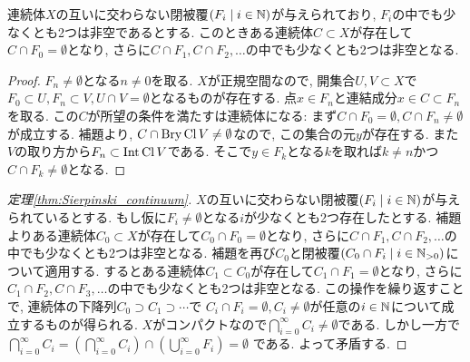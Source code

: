 \documentclass[uplatex, dvipdfmx, a4paper, 12pt, class=jsbook, crop=false]{standalone}
\begin{document}
\begin{lemma}
	連続体$ X $の互いに交わらない閉被覆$ \setfamily{F_i}{i \in \N} $が与えられており,
	$ F_i $の中でも少なくとも2つは非空であるとする.
	このときある連続体$ C \subset X $が存在して$ C \cap F_0 = \emptyset $となり,
	さらに$ C \cap F_1, C \cap F_2, \ldots $の中でも少なくとも2つは非空となる.
\end{lemma}

\begin{proof}
	$ F_n \neq \emptyset $となる$ n \neq 0 $を取る. $ X $が正規空間なので,
	開集合$ U, V \subset X $で$ F_0 \subset U, F_n \subset V, U \cap V = \emptyset $となるものが存在する.
	点$ x \in F_n $と連結成分$ x \in C \subset F_n $を取る.
	この$ C $が所望の条件を満たすは連続体になる: まず$ C \cap F_0 = \emptyset, C \cap F_n \neq \emptyset $が成立する.
	補題より, $ C \cap \mathop{\mathrm{Bry}}\nolimits\mathop{\mathrm{Cl}}\nolimits V \neq \emptyset $なので, この集合の元$ y $が存在する.
	また$ V $の取り方から$ F_n \subset \mathop{\mathrm{Int}}\nolimits \mathop{\mathrm{Cl}}\nolimits V $である.
	そこで$ y \in F_k $となる$ k $を取れば$ k \neq n $かつ$ C \cap F_k \neq \emptyset $となる.
\end{proof}

\begin{proof}[定理\ref{thm:Sierpinski_continuum}]
	$ X $の互いに交わらない閉被覆$ \setfamily{F_i}{i \in \N} $が与えられているとする.
	もし仮に$ F_i \neq \emptyset $となる$ i $が少なくとも2つ存在したとする.
	補題よりある連続体$ C_0 \subset X $が存在して$ C_0 \cap  F_0 = \emptyset$となり,
	さらに$ C \cap F_1, C \cap F_2, \ldots $の中でも少なくとも2つは非空となる.
	補題を再び$ C_0 $と閉被覆$ \setfamily{C_0 \cap F_i}{i \in \N_{>0}} $について適用する.
	するとある連続体$ C_1 \subset C_0 $が存在して$ C_1 \cap  F_1 = \emptyset$となり,
	さらに$ C_1 \cap F_2, C \cap F_3, \ldots $の中でも少なくとも2つは非空となる.
	この操作を繰り返すことで, 連続体の下降列$ C_0 \supset C_1 \supset \cdots $で
	$ C_i \cap F_i = \emptyset, C_i \neq \emptyset $が任意の$ i \in \mathbb{N} $について成立するものが得られる.
	$ X $がコンパクトなので$ \bigcap_{i=0}^{\infty} C_i \neq \emptyset $である.
	しかし一方で$ \bigcap_{i=0}^{\infty} C_i
	= \left(\bigcap_{i=0}^{\infty} C_i \right) \cap \left( \bigcup_{i=0}^{\infty} F_i \right) = \emptyset $ である. よって矛盾する.
\end{proof}


\end{document}
